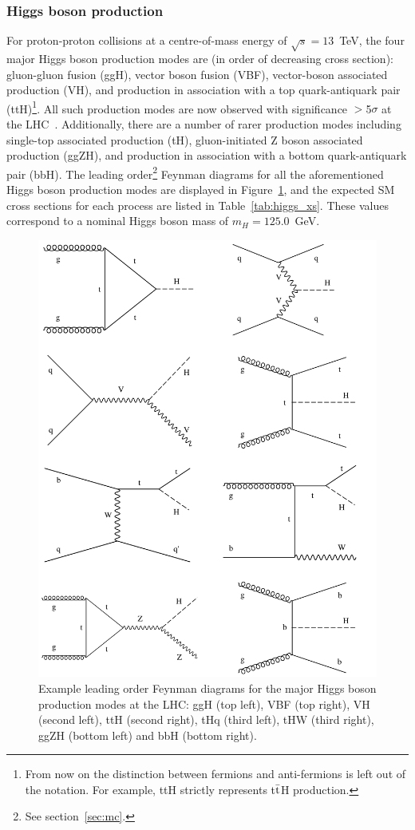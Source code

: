 \subsubsection{Higgs boson production}
For proton-proton collisions at a centre-of-mass energy of $\sqrt{s}=13$~TeV, the four major Higgs boson production modes are (in order of decreasing cross section): gluon-gluon fusion (ggH), vector boson fusion (VBF), vector-boson associated production (VH), and production in association with a top quark-antiquark pair (ttH)\footnote{From now on the distinction between fermions and anti-fermions is left out of the notation. For example, ttH strictly represents t$\bar{\rm{t}}$H production.}. All such production modes are now observed with significance $>$5$\sigma$ at the LHC~\cite{CMS-PAS-HIG-19-005,Aad:2019mbh}. Additionally, there are a number of rarer production modes including single-top associated production (tH), gluon-initiated Z boson associated production (ggZH), and production in association with a bottom quark-antiquark pair (bbH). The leading order\footnote{See section~\ref{sec:mc}.} Feynman diagrams for all the aforementioned Higgs boson production modes are displayed in Figure~\ref{fig:higgs_production_feynman}, and the expected SM cross sections for each process are listed in Table~\ref{tab:higgs_xs}. These values correspond to a nominal Higgs boson mass of $m_H=125.0$~GeV.

\begin{figure}[htb!]
  \centering
  \includegraphics[width=.8\linewidth]{Figures/theory/production_feynman.png}
  \caption[Leading order Feynman diagrams for the major Higgs boson production modes]
  {
    Example leading order Feynman diagrams for the major Higgs boson production modes at the LHC: ggH (top left), VBF (top right), VH (second left), ttH (second right), tHq (third left), tHW (third right), ggZH (bottom left) and bbH (bottom right).
  }
  \label{fig:higgs_production_feynman}
\end{figure}

